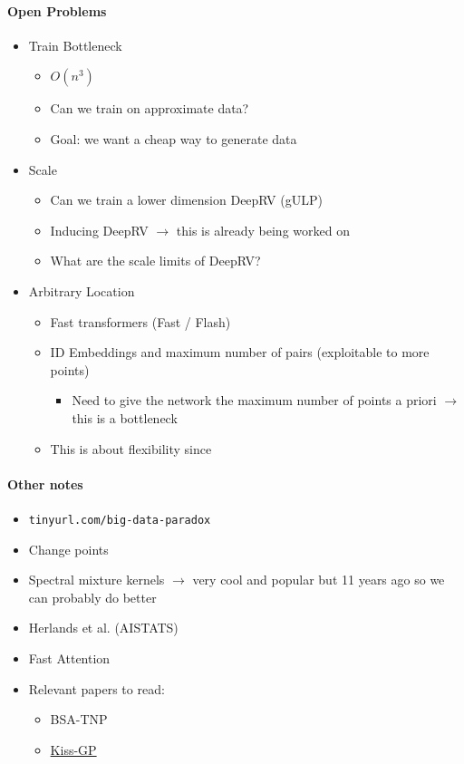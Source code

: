 \documentclass[12pt,a4paper,twoside]{article}
\begin{document}
\begin{meetingsummary}
	\paragraph{Open Problems}
	\begin{itemize}
	\item Train Bottleneck
	\begin{itemize}
		\item $O(n^3)$
		\item Can we train on approximate data?
		\item Goal: we want a cheap way to generate data
	\end{itemize}
	\item Scale
	\begin{itemize}
		\item Can we train a lower dimension DeepRV (gULP)
		\item Inducing DeepRV $\rightarrow$ this is already being worked on
		\item What are the scale limits of DeepRV?
	\end{itemize}
	\item Arbitrary Location
	\begin{itemize}
		\item Fast transformers (Fast / Flash)
		\item ID Embeddings and maximum number of pairs (exploitable to more points)
		\begin{itemize}
		\item Need to give the network the maximum number of points a priori $\rightarrow$ this is a bottleneck
		\end{itemize}
		\item This is about flexibility since
	\end{itemize}
	\end{itemize}

	\paragraph{Other notes}
	\begin{itemize}
	\item \texttt{tinyurl.com/big-data-paradox}
	\item Change points
	\item Spectral mixture kernels $\rightarrow$ very cool and popular but 11 years ago so we can probably do better
	\item Herlands et al. (AISTATS)
	\item Fast Attention
	\item Relevant papers to read:
		\begin{itemize}
			\item BSA-TNP~\cite{Jenson2025}
			\item \href{https://arxiv.org/abs/1503.01057}{Kiss-GP}
		\end{itemize}
	\end{itemize}
\end{meetingsummary}
\end{document}
